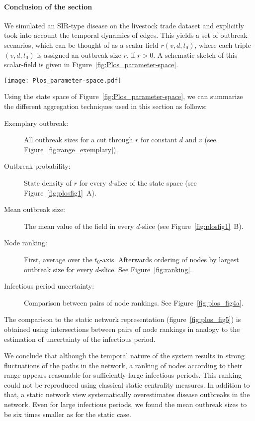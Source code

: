\paragraph{Conclusion of the section\color{Cayenne}{.}}
We simulated an SIR-type disease on the livestock trade dataset and explicitly took into account the temporal dynamics of edges.
This yields a set of outbreak scenarios, which can be thought of as a scalar-field $r(v,d,t_0)$, where each triple $(v,d,t_0)$ is assigned an outbreak size $r$, if $r>0$.
A schematic sketch of this scalar-field is given in Figure~\ref{fig:Plos_parameter-space}.
%
\begin{SCfigure}
\texttt{[image: Plos\_parameter-space.pdf]}
\caption{Scalar field representing the set of outbreak scenarios as defined in \eqref{eq:outbreak_set}.
Each combination of starting node $v$, starting time $t_0$ and infectious period $d$ yields an outbreak size $r(v,d,t_0)$.
The domain is bounded as defined in \eqref{eq:outbreak_set}.}
\label{fig:Plos_parameter-space}
\end{SCfigure}
%
Using the state space of Figure~\ref{fig:Plos_parameter-space}, we can summarize the different aggregation techniques used in this section as follows:
\begin{description}
\item [Exemplary outbreak:] All outbreak sizes for a cut through $r$ for constant $d$ and $v$ (see Figure~\ref{fig:range_exemplary}).
\item [Outbreak probability:] State density of $r$ for every $d$-slice of the state space (see Figure~\ref{fig:plosfig1}~A).
\item [Mean outbreak size:] The mean value of the field in every $d$-slice (see Figure~\ref{fig:plosfig1}~B).
\item [Node ranking:] First, average over the $t_0$-axis. Afterwards ordering of nodes by largest outbreak size for every $d$-slice. See Figure~\ref{fig:ranking}.
\item [Infectious period uncertainty:] Comparison between pairs of node rankings. See Figure~\ref{fig:plos_fig4a}.
\end{description}
%
The comparison to the static network representation (figure~\ref{fig:plos_fig5}) is obtained using intersections between pairs of node rankings in analogy to the estimation of uncertainty of the infectious period.

We conclude that although the temporal nature of the system results in strong fluctuations of the paths in the network, a ranking of nodes according to their range appears reasonable for sufficiently large infectious periods.
This ranking could not be reproduced using classical static centrality measures.
In addition to that, a static network view systematically overestimates disease outbreaks in the network.
Even for large infectious periods, we found the mean outbreak sizes to be six times smaller as for the static case.

